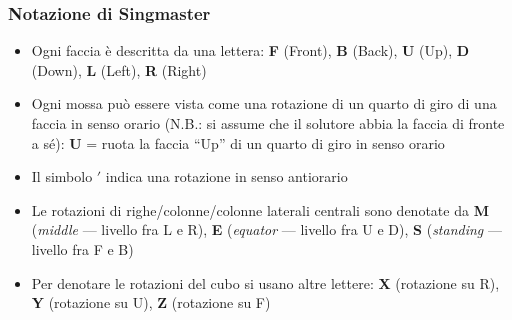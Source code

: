 \documentclass{beamer}
\begin{document}
\begin{frame}
\frametitle{Notazione di Singmaster}
\begin{itemize}
\item Ogni faccia è descritta da una lettera: \textbf{F} (Front), \textbf{B}
(Back), \textbf{U} (Up), \textbf{D} (Down), \textbf{L} (Left), \textbf{R}
(Right)
\item Ogni mossa può essere vista come una rotazione di un quarto di giro di
una faccia in senso orario (N.B.: si assume che il solutore abbia la faccia di
fronte a sé): \textbf{U} = ruota la faccia ``Up'' di un quarto di giro in senso
orario
\item Il simbolo $'$ indica una rotazione in senso antiorario
\item Le rotazioni di righe/colonne/colonne laterali centrali sono denotate da
\textbf{M} (\emph{middle} --- livello fra L e R), \textbf{E} (\emph{equator}
--- livello fra U e D), \textbf{S} (\emph{standing} --- livello fra F e B)
\item Per denotare le rotazioni del cubo si usano altre lettere: \textbf{X}
(rotazione su R), \textbf{Y} (rotazione su U), \textbf{Z} (rotazione su F)
\end{itemize}
\end{frame}
\end{document}
